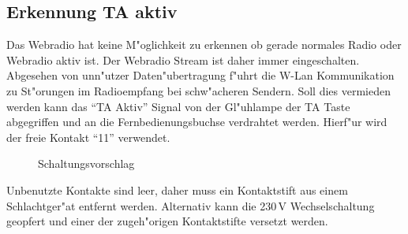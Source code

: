 \documentclass[ngerman,11pt,parskip=half] {scrartcl}
\begin{document}
\subsection{Erkennung TA aktiv} \label{sec:mod:erkennungta}

Das Webradio hat keine M"oglichkeit zu erkennen ob gerade normales Radio oder Webradio aktiv ist. Der Webradio Stream ist daher immer eingeschalten. Abgesehen von unn"utzer Daten"ubertragung f"uhrt die W-Lan Kommunikation zu St"orungen im Radioempfang bei schw"acheren Sendern. Soll dies vermieden werden kann das "`TA Aktiv"' Signal von der Gl"uhlampe der TA Taste abgegriffen und an die Fernbedienungsbuchse verdrahtet werden. Hierf"ur wird der freie Kontakt "`11"' verwendet.

\begin{figure}[H]
\centering
{}
\caption{Schaltungsvorschlag} \label{fig:1}
\end{figure}

Unbenutzte Kontakte sind leer, daher muss ein Kontaktstift aus einem Schlachtger"at entfernt werden. Alternativ kann die 230\,V Wechselschaltung geopfert und einer der zugeh"origen Kontaktstifte versetzt werden.
\end{document}
